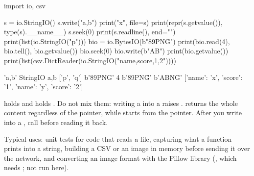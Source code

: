 \begin{center}
\end{center}

\begin{pycode}
import io, csv

s = io.StringIO()
s.write("a,b\n")
print("x", file=s)
print(repr(s.getvalue()), type(s).__name__)
s.seek(0)
print(s.readline(), end="")
print(list(io.StringIO("p\nq\n")))
bio = io.BytesIO(b"\x89PNG\r\n")
print(bio.read(4), bio.tell(), bio.getvalue())
bio.seek(0)
bio.write(b"AB")
print(bio.getvalue())
print(list(csv.DictReader(io.StringIO("name,score\nx,1\ny,2\n"))))
\end{pycode}
\begin{rawcode}
'a,b\nx\n' StringIO
a,b
['p\n', 'q\n']
b'\x89PNG' 4 b'\x89PNG\r\n'
b'ABNG\r\n'
[{'name': 'x', 'score': '1'}, {'name': 'y', 'score': '2'}]
\end{rawcode}

\begin{typecheck}
 holds  and  holds . Do not mix them: writing a
 into a  raises .  returns the whole
content regardless of the pointer, while  starts from the pointer. After you write
into a , call  before reading it back.
\end{typecheck}

Typical uses: unit tests for code that reads a file, capturing what a function prints into a
string, building a CSV or an image in memory before sending it over the network, and converting an
image format with the Pillow library (, which needs
; not run here).

